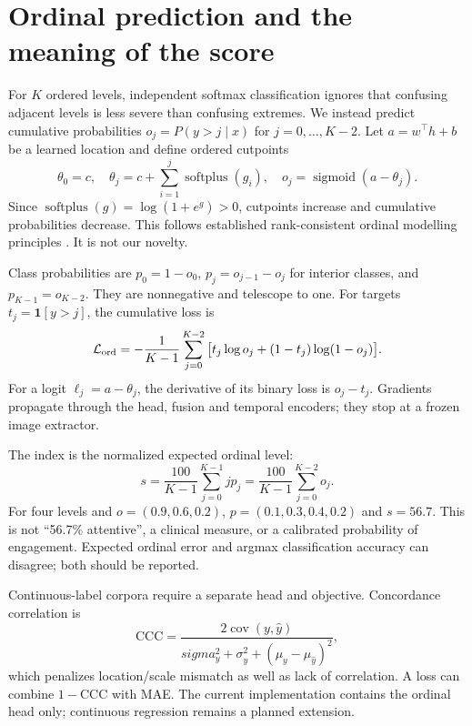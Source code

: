 \documentclass[10pt,a4paper]{article}
\newcommand{\ind}{\mathbf{1}}
\newcommand{\sigmoid}{\operatorname{sigmoid}}
\newcommand{\softplus}{\operatorname{softplus}}
\begin{document}
\section{Ordinal prediction and the meaning of the score}
For $K$ ordered levels, independent softmax classification ignores that confusing adjacent levels is less severe than confusing extremes. We instead predict cumulative probabilities $o_j=P(y>j\mid x)$ for $j=0,\ldots,K-2$. Let $a=w^\top h+b$ be a learned location and define ordered cutpoints
\begin{equation}
\theta_0=c,\quad \theta_j=c+\sum_{i=1}^j\softplus(g_i),\quad
o_j=\sigmoid(a-\theta_j).
\end{equation}
Since $\softplus(g)=\log(1+e^g)>0$, cutpoints increase and cumulative probabilities decrease. This follows established rank-consistent ordinal modelling principles \cite{coral}. It is not our novelty.

Class probabilities are $p_0=1-o_0$, $p_j=o_{j-1}-o_j$ for interior classes, and $p_{K-1}=o_{K-2}$. They are nonnegative and telescope to one. For targets $t_j=\ind[y>j]$, the cumulative loss is
\begin{equation}
\mathcal L_{\rm ord}=-\frac1{K-1}\sum_{j=0}^{K-2}
\big[t_j\log o_j+(1-t_j)\log(1-o_j)\big].
\end{equation}
For a logit $\ell_j=a-\theta_j$, the derivative of its binary loss is $o_j-t_j$. Gradients propagate through the head, fusion and temporal encoders; they stop at a frozen image extractor.

The index is the normalized expected ordinal level:
\begin{equation}
s=\frac{100}{K-1}\sum_{j=0}^{K-1}jp_j
=\frac{100}{K-1}\sum_{j=0}^{K-2}o_j.
\end{equation}
For four levels and $o=(0.9,0.6,0.2)$, $p=(0.1,0.3,0.4,0.2)$ and $s=56.7$. This is not ``56.7\% attentive'', a clinical measure, or a calibrated probability of engagement. Expected ordinal error and argmax classification accuracy can disagree; both should be reported.

Continuous-label corpora require a separate head and objective. Concordance correlation is
\begin{equation}
\mathrm{CCC}=\frac{2\operatorname{cov}(y,\hat y)}{sigma_y^2+\sigma_{\hat y}^2+(\mu_y-\mu_{\hat y})^2},
\end{equation}
which penalizes location/scale mismatch as well as lack of correlation. A loss can combine $1-\mathrm{CCC}$ with MAE. The current implementation contains the ordinal head only; continuous regression remains a planned extension.
\end{document}
